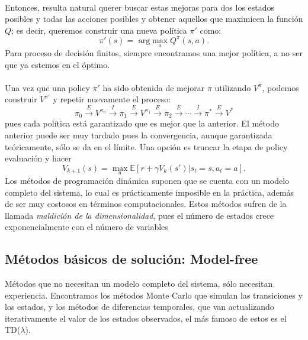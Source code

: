 \documentclass[11pt]{article}
\theoremstyle{plain}
\begin{document}
\\
Entonces, resulta natural querer buscar estas mejoras para dos los estados posibles y todas las acciones posibles y obtener aquellos que maximicen la función $Q$; es decir, queremos construir una nueva política $\pi'$ como:
\[ \pi'(s)= \textrm{ arg} \max_a Q^\pi (s,a). \]
Para proceso de decisión finitos, siempre encontramos una mejor política, a no ser que ya estemos en el óptimo.\\
\\
Una vez que una policy $\pi' $ ha sido obtenida de mejorar $\pi$ utilizando $V^\pi$, podemos construir $V^{\pi'}$ y repetir nuevamente el proceso:
\[ \pi_0 \xrightarrow{E} V^{\pi_0} \xrightarrow{I} \pi_1 \xrightarrow{E} V^{\pi_1} \xrightarrow{E} \pi_2 \xrightarrow{E} \cdots \xrightarrow{I} \pi^\ast \xrightarrow{E} V^\ast  \]
pues cada política está garantizado que es mejor que la anterior. El método anterior puede ser muy tardado pues la convergencia, aunque garantizada teóricamente, sólo se da en el límite. Una opción es truncar la etapa de policy evaluación y hacer
\[ V_{k+1}(s) = \max_a \mathbb{E}[r + \gamma V_k(s')|s_t=s,a_t=a]. \]
Los métodos de programación dinámica suponen que se cuenta con un modelo completo del sistema, lo cual es prácticamente imposible en la práctica, además de ser muy costosos en términos computacionales. Estos métodos sufren de la llamada \textit{maldición de la dimensionalidad}, pues el número de estados crece exponencialmente con el número de variables
\subsection{Métodos básicos de solución: Model-free}
Métodos que no necesitan un modelo completo del sistema, sólo necesitan experiencia. Encontramos los métodos Monte Carlo que simulan las transiciones y los estados, y los métodos de diferencias temporales, que van actualizando iterativamente el valor de los estados observados, el más famoso de estos es el TD($\lambda$).
\end{document}
